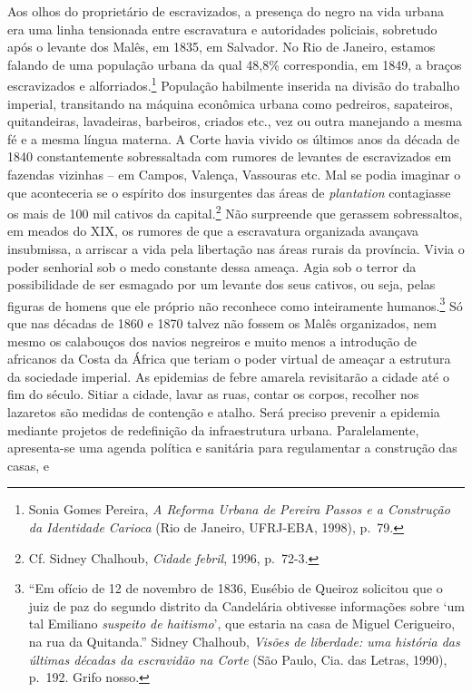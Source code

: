 Aos olhos do proprietário de escravizados, a presença do negro na vida
urbana era uma linha tensionada entre escravatura e autoridades
policiais, sobretudo após o levante dos Malês, em 1835, em Salvador. No
Rio de Janeiro, estamos falando de uma população urbana da qual 48,8\%
correspondia, em 1849, a braços escravizados e alforriados.\footnote{Sonia
  Gomes Pereira, \emph{A Reforma Urbana de Pereira Passos e a Construção
  da Identidade Carioca} (Rio de Janeiro, UFRJ-EBA, 1998), p.~79.}
População habilmente inserida na divisão do trabalho imperial,
transitando na máquina econômica urbana como pedreiros, sapateiros,
quitandeiras, lavadeiras, barbeiros, criados etc., vez ou outra
manejando a mesma fé e a mesma língua materna. A Corte havia vivido os
últimos anos da década de 1840 constantemente sobressaltada com rumores
de levantes de escravizados em fazendas vizinhas -- em Campos, Valença,
Vassouras etc. Mal se podia imaginar o que aconteceria se o espírito dos
insurgentes das áreas de \emph{plantation} contagiasse os mais de 100
mil cativos da capital.\footnote{Cf. Sidney Chalhoub, \emph{Cidade
  febril}, 1996, p.~72-3.} Não surpreende que gerassem sobressaltos, em
meados do XIX, os rumores de que a escravatura organizada avançava
insubmissa, a arriscar a vida pela libertação nas áreas rurais da
província. Vivia o poder senhorial sob o medo constante dessa ameaça.
Agia sob o terror da possibilidade de ser esmagado por um levante dos
seus cativos, ou seja, pelas figuras de homens que ele próprio não
reconhece como inteiramente humanos.\footnote{``Em ofício de 12 de
  novembro de 1836, Eusébio de Queiroz solicitou que o juiz de paz do
  segundo distrito da Candelária obtivesse informações sobre `um tal
  Emiliano \emph{suspeito de haitismo}', que estaria na casa de Miguel
  Cerigueiro, na rua da Quitanda.'' Sidney Chalhoub, \emph{Visões de
  liberdade: uma história das últimas décadas da escravidão na Corte}
  (São Paulo, Cia. das Letras, 1990), p.~192. Grifo nosso.} Só que nas
décadas de 1860 e 1870 talvez não fossem os Malês organizados, nem mesmo
os calabouços dos navios negreiros e muito menos a introdução de
africanos da Costa da África que teriam o poder virtual de ameaçar a
estrutura da sociedade imperial. As epidemias de febre amarela
revisitarão a cidade até o fim do século. Sitiar a cidade, lavar as
ruas, contar os corpos, recolher nos lazaretos são medidas de contenção
e atalho. Será preciso prevenir a epidemia mediante projetos de
redefinição da infraestrutura urbana. Paralelamente, apresenta-se uma
agenda política e sanitária para regulamentar a construção das casas, e
